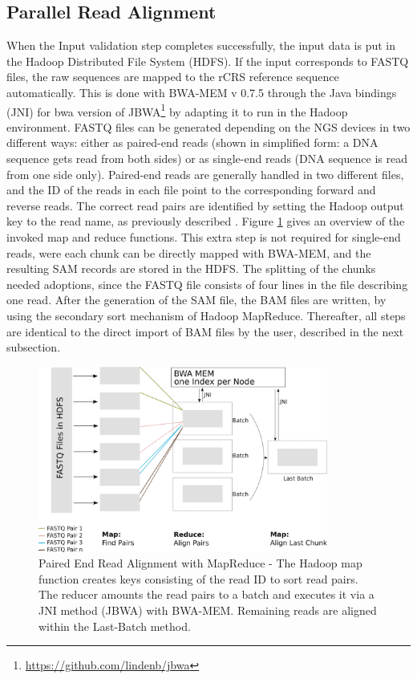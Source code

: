 \subsection{Parallel Read Alignment}
When the Input validation step completes successfully, the input data is put in the Hadoop Distributed File System (HDFS). If the input corresponds to FASTQ files, the raw sequences are mapped to the rCRS reference sequence automatically. This is done with BWA-MEM v 0.7.5 \cite{Li2013a} through the Java bindings (JNI) for bwa version of JBWA\footnote{\url{https://github.com/lindenb/jbwa}} by adapting it to run in the Hadoop environment. FASTQ files can be generated depending on the NGS devices in two different ways: either as paired-end reads (shown in simplified form: a DNA sequence gets read from both sides) or as single-end reads (DNA sequence is read from one side only). Paired-end reads are generally handled in two different files, and the ID of the reads in each file point to the corresponding forward and reverse reads.
The correct read pairs are identified by setting the Hadoop output key to the read name, as previously described \cite{Weissensteiner2016b, Pireddu2011}. Figure \ref{fig:mapreduce} gives an overview of the invoked map and reduce functions. This extra step is not required for single-end reads, were each chunk can be directly mapped with BWA-MEM, and the resulting SAM records are stored in the HDFS. The splitting of the chunks needed adoptions, since the FASTQ file consists of four lines in the file describing one read. After the generation of the SAM file, the BAM files are written, by using the secondary sort mechanism of Hadoop MapReduce. Thereafter, all steps are identical to the direct import of BAM files by the user, described in the next subsection.
\begin{figure}[!ht]
    \centering
    \includegraphics[width=0.85\textwidth]{images/mapred.png}
    \caption[Paired End Read Alignment with MapReduce]{Paired End Read Alignment with MapReduce - The Hadoop map function creates keys consisting of the read ID to sort read pairs. The reducer amounts the read pairs to a batch and executes it via a JNI method (JBWA) with BWA-MEM. Remaining reads are aligned within the Last-Batch method.  }
    \label{fig:mapreduce}
\end{figure}
